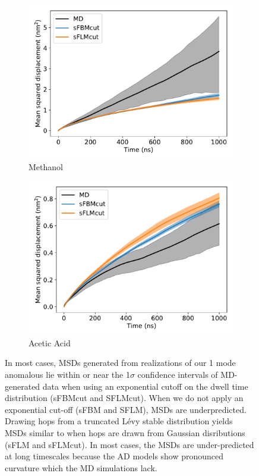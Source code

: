 \documentclass[12pt]{article}
\begin{document}
\begin{figure}
\begin{subfigure}{0.45\textwidth}
  \includegraphics[width=\textwidth]{1mode_msd_comparison_MET.pdf}
  \caption{Methanol}\label{fig:1mode_msd_comparison_MET}
  \end{subfigure}
  \begin{subfigure}{0.45\textwidth}
  \includegraphics[width=\textwidth]{1mode_msd_comparison_ACH.pdf}
  \caption{Acetic Acid}\label{fig:1mode_msd_comparison_ACH}
  \end{subfigure}
  \caption{In most cases, MSDs generated from realizations of our 1 mode anomalous
  lie within or near the 1$\sigma$ confidence intervals of MD-generated data when using an
  exponential cutoff on the dwell time distribution (sFBMcut and SFLMcut). When we
  do not apply an exponential cut-off (sFBM and SFLM), MSDs are underpredicted. 
  Drawing hops from a truncated L\'evy stable distribution yields MSDs similar to 
  when hops are drawn from Gaussian disributions (sFLM and sFLMcut). In most 
  cases, the MSDs are under-predicted at long timescales because the AD models
  show pronounced curvature which the MD simulations lack.}\label{fig:anomalous_msds_1mode}
  \end{figure}
  
\end{document}
